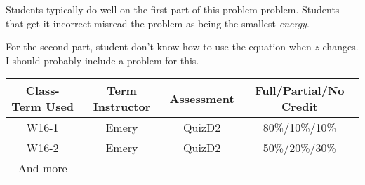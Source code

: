 \begin{outcomes}

Students typically do well on the first part of this problem problem. Students that get it incorrect misread the problem as being the smallest \emph{energy}.

For the second part, student don't know how to use the equation when $z$ changes. I should probably include a problem for this.

	\begin{center}
		\begin{tabular}{cccc}
			\hline\hline
			Class-Term Used & Term Instructor & Assessment & Full/Partial/No Credit\\
			\hline
			W16-1 & Emery & QuizD2 & 80\%/10\%/10\%\\    %
			W16-2 & Emery & QuizD2 & 50\%/20\%/30\%\\    %
			And more\\
			\hline
		\end{tabular}
	\end{center}
\end{outcomes}

\begin{comments}

\end{comments}